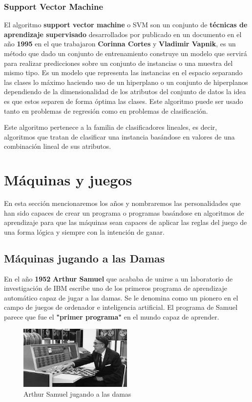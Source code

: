 \documentclass[a4paper, 11pt]{article} %
\begin{document}
\subsubsection{Support Vector Machine}
El algoritmo \textbf{support vector machine} o SVM son un conjunto de \textbf{técnicas de aprendizaje supervisado} desarrollados por publicado en un documento en el año \textbf{1995} en el que trabajaron \textbf{Corinna Cortes} y \textbf{Vladimir Vapnik}, es un método que dado un conjunto de entrenamiento construye un modelo que servirá para realizar predicciones sobre un conjunto de instancias o una muestra del mismo tipo. Es un modelo que representa las instancias en el espacio separando las clases lo máximo haciendo uso de un hiperplano o un conjunto de hiperplanos dependiendo de la dimensionalidad de los atributos del conjunto de datos la idea es que estos  separen de forma óptima las clases. Este algoritmo puede ser usado tanto en problemas de regresión como en problemas de clasificación.

Este algoritmo pertenece a la familia de clasificadores lineales, es decir, algoritmos que tratan de clasificar una instancia basándose en valores de una combinación lineal de sus atributos.

\section{Máquinas y juegos}
En esta sección mencionaremos los años y nombraremos las personalidades que han sido capaces de crear un programa o programas basándose en algoritmos de aprendizaje para que las máquinas sean capaces de aplicar las reglas del juego de una forma lógica y siempre con la intención de ganar.
\subsection{Máquinas jugando a las Damas}
En el año \textbf{1952} \textbf{Arthur Samuel }que acababa de unirse a un laboratorio de investigación de IBM escribe uno de los primeros programa de aprendizaje automático capaz de jugar a las damas. Se le denomina como un pionero en el campo de juegos de ordenador e inteligencia artificial. El programa de Samuel parece que fue el \textbf{"primer programa"} en el mundo capaz de aprender.

\begin{figure}[H]
\centering
\includegraphics[width=0.5\textwidth]{acc}
\caption{Arthur Samuel jugando a las damas}
\label{Ejemplo kNN}
\end{figure}
\end{document}
